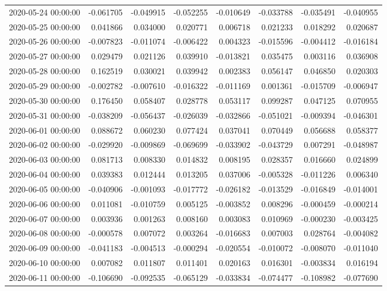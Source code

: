 \begin{tabular}{lrrrrrrr}
2020-05-24 00:00:00 & -0.061705 & -0.049915 & -0.052255 & -0.010649 & -0.033788 & -0.035491 & -0.040955 \\
2020-05-25 00:00:00 & 0.041866 & 0.034000 & 0.020771 & 0.006718 & 0.021233 & 0.018292 & 0.020687 \\
2020-05-26 00:00:00 & -0.007823 & -0.011074 & -0.006422 & 0.004323 & -0.015596 & -0.004412 & -0.016184 \\
2020-05-27 00:00:00 & 0.029479 & 0.021126 & 0.039910 & -0.013821 & 0.035475 & 0.003116 & 0.036908 \\
2020-05-28 00:00:00 & 0.162519 & 0.030021 & 0.039942 & 0.002383 & 0.056147 & 0.046850 & 0.020303 \\
2020-05-29 00:00:00 & -0.002782 & -0.007610 & -0.016322 & -0.011169 & 0.001361 & -0.015709 & -0.006947 \\
2020-05-30 00:00:00 & 0.176450 & 0.058407 & 0.028778 & 0.053117 & 0.099287 & 0.047125 & 0.070955 \\
2020-05-31 00:00:00 & -0.038209 & -0.056437 & -0.026039 & -0.032866 & -0.051021 & -0.009394 & -0.046301 \\
2020-06-01 00:00:00 & 0.088672 & 0.060230 & 0.077424 & 0.037041 & 0.070449 & 0.056688 & 0.058377 \\
2020-06-02 00:00:00 & -0.029920 & -0.009869 & -0.069699 & -0.033902 & -0.043729 & 0.007291 & -0.048987 \\
2020-06-03 00:00:00 & 0.081713 & 0.008330 & 0.014832 & 0.008195 & 0.028357 & 0.016660 & 0.024899 \\
2020-06-04 00:00:00 & 0.039383 & 0.012444 & 0.013205 & 0.037006 & -0.005328 & -0.011226 & 0.006340 \\
2020-06-05 00:00:00 & -0.040906 & -0.001093 & -0.017772 & -0.026182 & -0.013529 & -0.016849 & -0.014001 \\
2020-06-06 00:00:00 & 0.011081 & -0.010759 & 0.005125 & -0.003852 & 0.008296 & -0.000459 & -0.000214 \\
2020-06-07 00:00:00 & 0.003936 & 0.001263 & 0.008160 & 0.003083 & 0.010969 & -0.000230 & -0.003425 \\
2020-06-08 00:00:00 & -0.000578 & 0.007072 & 0.003264 & -0.016683 & 0.007003 & 0.028764 & -0.004082 \\
2020-06-09 00:00:00 & -0.041183 & -0.004513 & -0.000294 & -0.020554 & -0.010072 & -0.008070 & -0.011040 \\
2020-06-10 00:00:00 & 0.007082 & 0.011807 & 0.011401 & 0.020163 & 0.016301 & -0.003834 & 0.016194 \\
2020-06-11 00:00:00 & -0.106690 & -0.092535 & -0.065129 & -0.033834 & -0.074477 & -0.108982 & -0.077690 \\

\end{tabular}
